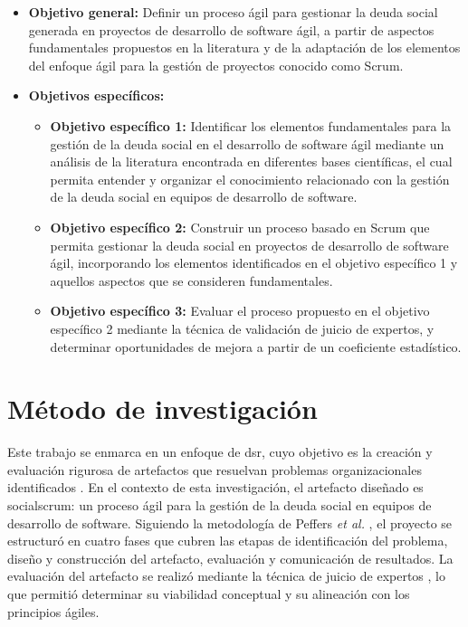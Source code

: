 \begin{itemize}
\item \textbf{Objetivo general:} Definir un proceso ágil para gestionar la deuda social generada en proyectos de desarrollo de software ágil, a partir de aspectos fundamentales propuestos en la literatura y de la adaptación de los elementos del enfoque ágil para la gestión de proyectos conocido como Scrum.
\item \textbf{Objetivos específicos:}
    \begin{itemize}
        \item \textbf{Objetivo específico 1:} Identificar los elementos fundamentales para la gestión de la deuda social en el desarrollo de software ágil mediante un análisis de la literatura encontrada en diferentes bases científicas, el cual permita entender y organizar el conocimiento relacionado con la gestión de la deuda social en equipos de desarrollo de software.
        \item \textbf{Objetivo específico 2:} Construir un proceso basado en Scrum que permita gestionar la deuda social en proyectos de desarrollo de software ágil, incorporando los elementos identificados en el objetivo específico 1 y aquellos aspectos que se consideren fundamentales.
        \item \textbf{Objetivo específico 3:} Evaluar el proceso propuesto en el objetivo específico 2 mediante la técnica de validación de juicio de expertos, y determinar oportunidades de mejora a partir de un coeficiente estadístico.
    \end{itemize}
\end{itemize}

\section{Método de investigación}
\label{sec:metodo-investigacion}
Este trabajo se enmarca en un enfoque de \gls{dsr}, cuyo objetivo es la creación y evaluación rigurosa de artefactos que resuelvan problemas organizacionales identificados \cite{hevner2004designscience, peffers2007dsrm}. En el contexto de esta investigación, el artefacto diseñado es \gls{socialscrum}: un proceso ágil para la gestión de la deuda social en equipos de desarrollo de software. Siguiendo la metodología de Peffers \textit{et al.} \cite{peffers2007dsrm}, el proyecto se estructuró en cuatro fases que cubren las etapas de identificación del problema, diseño y construcción del artefacto, evaluación y comunicación de resultados. La evaluación del artefacto se realizó mediante la técnica de juicio de expertos \cite{Adillah2022}, lo que permitió determinar su viabilidad conceptual y su alineación con los principios ágiles.

